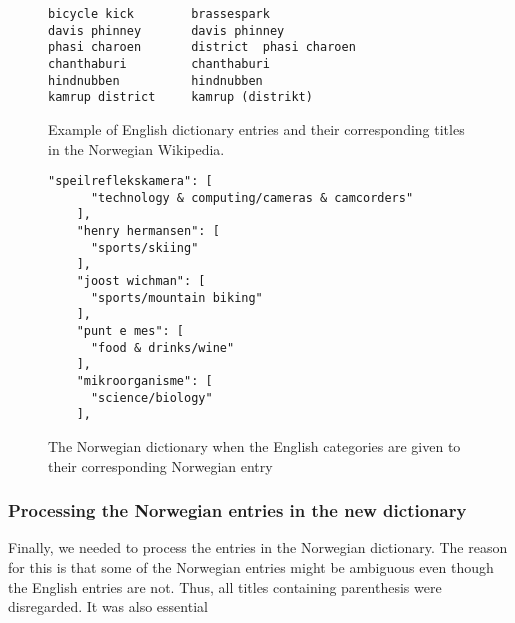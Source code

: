  
 \begin{comment}
Then I needed to find the corresponding English article name for the page id, which was done by looping through relevant pages in the \enwikicatlink file since all entries are on the form: 
 
\begin{figure}[h]
\centering
\begin{lstlisting}
INSERT INTO `categorylinks` VALUES (0,'','','2014-01-16 15:23:19','','','page'),(10,'Redirects_from_moves','ACCESSIBLECOMPUTING','2014-10-26 04:50:23','','uppercase','page')
\end{lstlisting}
\caption{Caption}
\label{fig:redirect_example_catlink}
\end{figure}
id 10 equals accesiblecomputing. 
\end{comment}

\begin{figure}[h]
\centering
\begin{lstlisting}
bicycle kick        brassespark
davis phinney       davis phinney
phasi charoen       district  phasi charoen
chanthaburi         chanthaburi
hindnubben          hindnubben
kamrup district     kamrup (distrikt)
\end{lstlisting}
\caption[English dictionary entry and Norwegian article title]{Example of English dictionary entries and their corresponding titles in the Norwegian Wikipedia.}
\label{fig:en_to_nok}
\end{figure}


\begin{figure}[h]
\centering
\begin{lstlisting}
"speilreflekskamera": [
      "technology & computing/cameras & camcorders"
    ], 
    "henry hermansen": [
      "sports/skiing"
    ], 
    "joost wichman": [
      "sports/mountain biking"
    ], 
    "punt e mes": [
      "food & drinks/wine"
    ], 
    "mikroorganisme": [
      "science/biology"
    ], 
\end{lstlisting}
\caption[Example of a Norwegian dicitonary-based classifier]{The Norwegian dictionary when the English categories are given to their corresponding Norwegian entry}
\label{fig:norwegian_dictionary}
\end{figure}


\subsubsection{Processing the Norwegian entries in the new dictionary}
Finally, we needed to process the entries in the Norwegian dictionary. The reason for this is that some of the Norwegian entries might be ambiguous even though the English entries are not. Thus, all titles containing parenthesis were disregarded. It was also essential 



